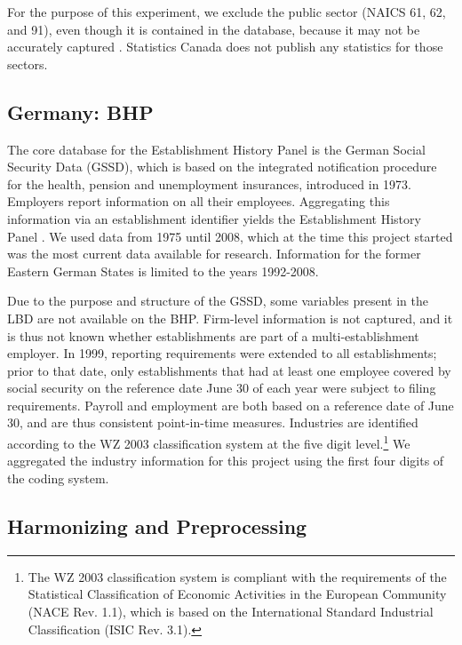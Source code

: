 \documentclass[10pt]{article}
\begin{document}
For the purpose of this experiment,  we exclude the public sector (NAICS 61, 62, and 91), even though it is contained in the database, because it may not be accurately captured \citep{StatisticsCanada2019}. Statistics Canada does not publish any statistics for those sectors. 
\subsection{Germany: \acf{BHP}}



The core database for the Establishment History Panel is the German Social Security Data  (GSSD), which is based on the integrated notification procedure for the health, pension and unemployment insurances,   introduced in  1973. Employers report information on all their employees. Aggregating this information via an establishment identifier yields the Establishment History Panel \citep[German abbreviation: BHP]{BHP}. We used data from  1975 until 2008, which at the time this project started was the most current data available for research. Information for the former Eastern German States is limited to the years 1992-2008. 

Due to the purpose and structure of the GSSD, some variables present in the \ac{LBD} are not available on the  \ac{BHP}. Firm-level information is not captured, and it is thus not known whether establishments are part of a multi-establishment employer. In 1999, reporting requirements were extended to all establishments; prior to that date, only establishments that  had at least one employee covered by social security on the reference date June 30 of each year were subject to filing requirements. Payroll and employment are both based on a reference date of June 30, and are thus consistent point-in-time measures. 
Industries are identified according to the WZ 2003 classification system \citep{WZ2003} at the five digit level.\footnote{The WZ 2003 classification system is compliant with the requirements of the Statistical Classification of Economic Activities in the European Community (NACE Rev. 1.1), which is based on the International Standard Industrial Classification (ISIC Rev. 3.1).} We aggregated the industry information for this project  using the first four digits of the coding system.




 
\subsection{Harmonizing and Preprocessing}
\end{document}
